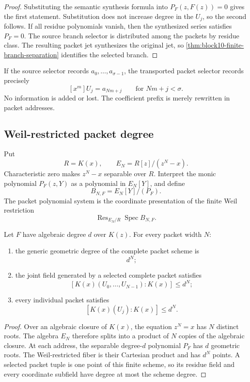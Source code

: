 \begin{proof}
Substituting the semantic synthesis formula into $P_F(z,F(z))=0$ gives the first statement.  Substitution does not increase degree in the $U_j$, so the second follows.  If all residue polynomials vanish, then the synthesized series satisfies $P_F=0$.  The source branch selector is distributed among the packets by residue class.  The resulting packet jet synthesizes the original jet, so \cref{thm:block10-finite-branch-separation} identifies the selected branch.
\end{proof}

If the source selector records $a_0,\ldots,a_{\sigma-1}$, the transported packet selector records precisely
\[
 [x^m]U_j=a_{Nm+j}
 \qquad
 \text{for }Nm+j<\sigma.
\]
No information is added or lost.  The coefficient prefix is merely rewritten in packet addresses.

\subsection{Weil-restricted packet degree}
\label{subsec:block10-weil-degree}

Put
\[
 R=K(x),
 \qquad
 E_N=R[z]/(z^N-x).
\]
Characteristic zero makes $z^N-x$ separable over $R$.  Interpret the monic polynomial $P_F(z,Y)$ as a polynomial in $E_N[Y]$, and define
\[
 B_{N,F}=E_N[Y]/(P_F).
\]
The packet polynomial system is the coordinate presentation of the finite Weil restriction
\[
 \operatorname{Res}_{E_N/R}\operatorname{Spec}B_{N,F}.
\]

\begin{theorem}
\label{thm:block10-packet-degree-bound}
Let $F$ have algebraic degree $d$ over $K(z)$.  For every packet width $N$:
\begin{enumerate}
\item the generic geometric degree of the complete packet scheme is
\[
 \boxed{d^N;}
\]
\item the joint field generated by a selected complete packet satisfies
\[
 \boxed{
 [K(x)(U_0,\ldots,U_{N-1}):K(x)]\leq d^N;}
\]
\item every individual packet satisfies
\[
 \boxed{
 [K(x)(U_j):K(x)]\leq d^N.}
\]
\end{enumerate}
\end{theorem}

\begin{proof}
Over an algebraic closure of $K(x)$, the equation $z^N=x$ has $N$ distinct roots.  The algebra $E_N$ therefore splits into a product of $N$ copies of the algebraic closure.  At each address, the separable degree-$d$ polynomial $P_F$ has $d$ geometric roots.  The Weil-restricted fiber is their Cartesian product and has $d^N$ points.  A selected packet tuple is one point of this finite scheme, so its residue field and every coordinate subfield have degree at most the scheme degree.
\end{proof}

